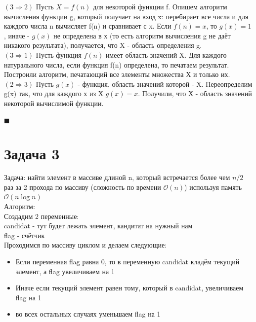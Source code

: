 \documentclass[a4paper,12pt]{article} %
\begin{document}
$(3\Rightarrow2)$
Пусть $X = f(n)$ для некоторой функции f. Опишем алгоритм вычисления функции g, который получает на вход x: перебирает все числа и для каждого числа n вычисляет f(n) и сравнивает с x. 
Если $f(n) = x$, то $g(x) = 1$, иначе - $g(x)$ не определена в х (то есть алгоритм вычисления g не даёт никакого результата), получается, что X - область определения g.\\

$(3 \Rightarrow 1)$
Пусть функция $f(n)$ имеет область значений X. Для каждого натурального числа, если функция f(n) определена, то печатаем результат. Построили алгоритм, печатающий все элементы множества Х и только их.\\

$(2 \Rightarrow 3)$
Пусть $g(x)$ - функция, область значений которой - X. Переопределим g(x) так, что для каждого х из Х $g(x)=x$. Получили, что $Х$ - область значений некоторой вычислимой функции.
\begin{flushright}
	$\blacksquare$
\end{flushright}




\section*{Задача 3}
Задача: найти элемент в массиве длиной n, который встречается более чем $n/2$ раз за 2 прохода по массиву (сложность по времени $\mathcal{O}(n)$) используя память $\mathcal{O}(n\log{}n)$\\

Алгоритм:\\
Создадим 2 переменные:\\
candidat - тут будет лежать элемент, кандитат на нужный нам\\
flag - счётчик\\

Проходимся по массиву циклом и делаем следующие:\\

\begin{itemize}
\item Если переменная flag равна 0, то в переменную candidat кладём текущий элемент, а flag увеличиваем на 1
\item Иначе если текущий элемент равен тому, который в candidat, увеличиваем flag на 1
\item во всех остальных случаях уменьшаем flag на 1
\end{itemize}
\end{document}
